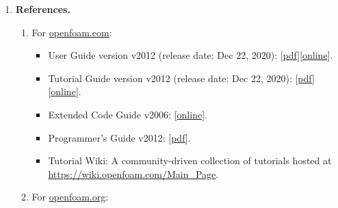 \documentclass[onsided]{book}
\numberwithin{equation}{section}
\newtheorem{remark}{Remark}[section]
\begin{document}
\begin{enumerate}
    \begin{remark}
        Provided these versions are already compiled properly, I can switch easily between these versions of OpenFOAM by activating/uncommenting the correct line and commenting lines for other versions in the \verb|~/.bashrc| file, e.g.,
        \begin{verbatim}
. /opt/openfoam-dev/etc/bashrc
# . /opt/openfoam8/etc/bashrc
# source $HOME/OpenFOAM/OpenFOAM-2.1.1/etc/bashrc
# source $HOME/OpenFOAM/OpenFOAM-v2006/etc/bashrc
# source $HOME/OpenFOAM/OpenFOAM-dev/etc/bashrc            
        \end{verbatim}
        and source them in the current terminal
        \begin{verbatim}
source ~/.bashrc
        \end{verbatim}
        or you just need to open a new terminal and the \verb|~/.bashrc| will be sourced automatically by the nature of Unix/Linux Operating Systems.
    \end{remark}
    \item \textbf{References.}
    \begin{enumerate}
        \item For \href{https://www.openfoam.com/}{openfoam.com}:
        \begin{itemize}
            \item User Guide version v2012 (release date: Dec 22, 2020): [\href{https://sourceforge.net/projects/openfoam/files/v2012/UserGuide.pdf}{pdf}][\href{https://www.openfoam.com/documentation/user-guide}{online}].
            \item Tutorial Guide version v2012 (release date: Dec 22, 2020): [\href{https://sourceforge.net/projects/openfoam/files/v2012/TutorialGuide.pdf}{pdf}][\href{https://www.openfoam.com/documentation/tutorial-guide}{online}].
            \item Extended Code Guide v2006: [\href{https://www.openfoam.com/documentation/guides/latest/doc/}{online}].
            \item Programmer's Guide v2012: [\href{https://sourceforge.net/projects/openfoam/files/v2012/ProgrammersGuide.pdf}{pdf}].
            \item Tutorial Wiki: A community-driven collection of tutorials hosted at \url{https://wiki.openfoam.com/Main_Page}.
        \end{itemize}
        \item For \href{https://openfoam.org/}{openfoam.org}:
        \begin{itemize}

\end{itemize}
\end{enumerate}
\end{enumerate}
\end{document}
